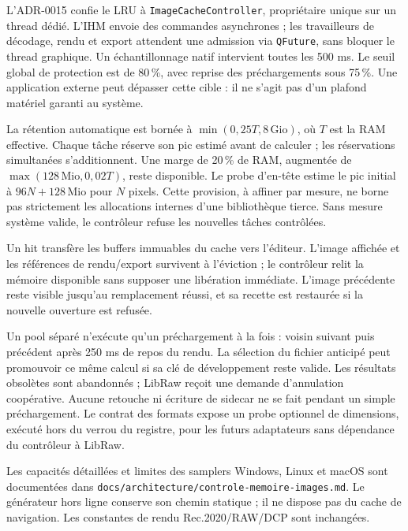L'ADR-0015 confie le LRU à \texttt{ImageCacheController}, propriétaire unique
sur un thread dédié. L'IHM envoie des commandes asynchrones ; les travailleurs
de décodage, rendu et export attendent une admission via \texttt{QFuture},
sans bloquer le thread graphique. Un échantillonnage natif intervient toutes
les 500 ms. Le seuil global de protection est de 80\,\%, avec reprise des
préchargements sous 75\,\%. Une application externe peut dépasser cette cible :
il ne s'agit pas d'un plafond matériel garanti au système.

La rétention automatique est bornée à $\min(0{,}25 T, 8\,\mathrm{Gio})$, où
$T$ est la RAM effective. Chaque tâche réserve son pic estimé avant de
calculer ; les réservations simultanées s'additionnent. Une marge de 20\,\%
de RAM, augmentée de $\max(128\,\mathrm{Mio},0{,}02T)$, reste disponible.
Le probe d'en-tête estime le pic initial à $96N+128\,\mathrm{Mio}$ pour
$N$ pixels. Cette provision, à affiner par mesure, ne borne pas strictement
les allocations internes d'une bibliothèque tierce. Sans mesure système
valide, le contrôleur refuse les nouvelles tâches contrôlées.

Un hit transfère les buffers immuables du cache vers l'éditeur. L'image
affichée et les références de rendu/export survivent à l'éviction ; le
contrôleur relit la mémoire disponible sans supposer une libération immédiate.
L'image précédente reste visible jusqu'au remplacement réussi, et sa recette
est restaurée si la nouvelle ouverture est refusée.

Un pool séparé n'exécute qu'un préchargement à la fois : voisin suivant puis
précédent après 250 ms de repos du rendu. La sélection du fichier anticipé
peut promouvoir ce même calcul si sa clé de développement reste valide.
Les résultats obsolètes sont abandonnés ; LibRaw reçoit une demande
d'annulation coopérative. Aucune retouche ni écriture de sidecar ne se fait
pendant un simple préchargement. Le contrat des formats expose un probe
optionnel de dimensions, exécuté hors du verrou du registre, pour les futurs
adaptateurs sans dépendance du contrôleur à LibRaw.

Les capacités détaillées et limites des samplers Windows, Linux et macOS
sont documentées dans \texttt{docs/architecture/controle-memoire-images.md}.
Le générateur hors ligne conserve son chemin statique ; il ne dispose pas
du cache de navigation. Les constantes de rendu Rec.2020/RAW/DCP sont inchangées.
